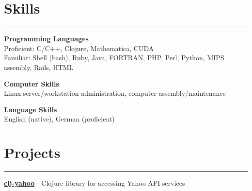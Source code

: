\documentclass[a4paper,11pt]{article}
\begin{document}
\section*{\huge{Skills}}
\hrule
\vspace{0.1in}
\textbf{Programming Languages} \\
Proficient: C/C++, Clojure, Mathematica, CUDA \\
Familiar: Shell (bash), Ruby, Java, FORTRAN, PHP, Perl, Python, MIPS assembly, Rails, HTML

\vspace{0.1in}

\textbf{Computer Skills} \\
Linux server/workstation administration, computer assembly/maintenance

\vspace{0.1in}

\textbf{Language Skills} \\
English (native), German (proficient)

\section*{\huge{Projects}}
\hrule
\vspace{0.1in}
\textbf{\href{http://github.com/thesquelched/clj-yahoo}{clj-yahoo}}
 - Clojure library for accessing Yahoo API services
\end{document}
